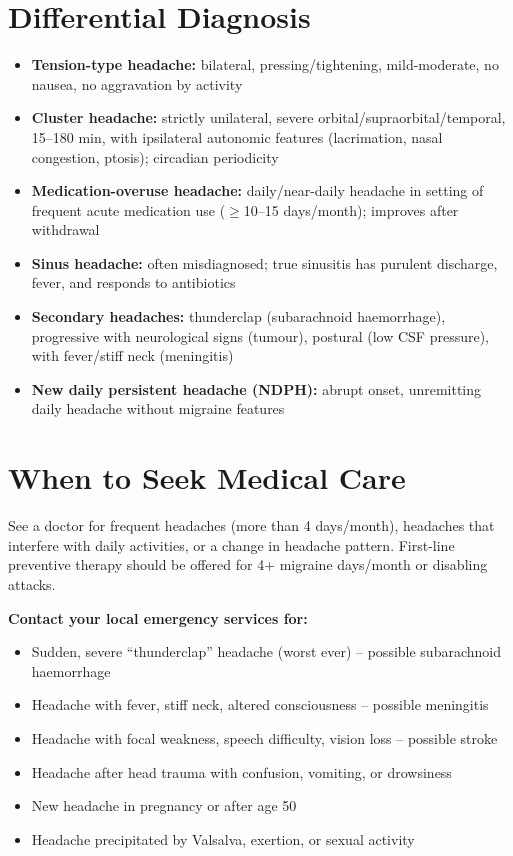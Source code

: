 \section*{Differential Diagnosis}
\begin{itemize}
    \item \textbf{Tension-type headache:} bilateral, pressing/tightening, mild-moderate, no nausea, no aggravation by activity
    \item \textbf{Cluster headache:} strictly unilateral, severe orbital/supraorbital/temporal, 15--180 min, with ipsilateral autonomic features (lacrimation, nasal congestion, ptosis); circadian periodicity
    \item \textbf{Medication-overuse headache:} daily/near-daily headache in setting of frequent acute medication use ($\ge$10--15 days/month); improves after withdrawal
    \item \textbf{Sinus headache:} often misdiagnosed; true sinusitis has purulent discharge, fever, and responds to antibiotics
    \item \textbf{Secondary headaches:} thunderclap (subarachnoid haemorrhage), progressive with neurological signs (tumour), postural (low CSF pressure), with fever/stiff neck (meningitis)
    \item \textbf{New daily persistent headache (NDPH):} abrupt onset, unremitting daily headache without migraine features
\end{itemize}

\section*{When to Seek Medical Care}
See a doctor for frequent headaches (more than 4 days/month), headaches that interfere with daily activities, or a change in headache pattern. First-line preventive therapy should be offered for 4+ migraine days/month or disabling attacks.

\textbf{Contact your local emergency services for:}
\begin{itemize}
    \item Sudden, severe ``thunderclap'' headache (worst ever) -- possible subarachnoid haemorrhage
    \item Headache with fever, stiff neck, altered consciousness -- possible meningitis
    \item Headache with focal weakness, speech difficulty, vision loss -- possible stroke
    \item Headache after head trauma with confusion, vomiting, or drowsiness
    \item New headache in pregnancy or after age 50
    \item Headache precipitated by Valsalva, exertion, or sexual activity
\end{itemize}

